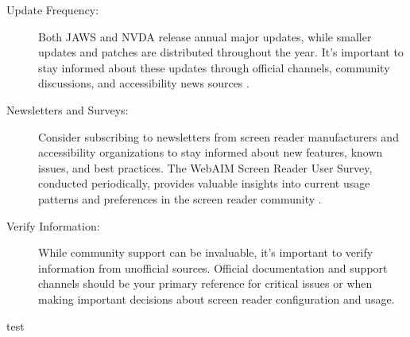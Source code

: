\begin{description}
	\item[Update Frequency:] Both JAWS and NVDA release annual major updates, while smaller updates and patches are distributed throughout the year. It's important to stay informed about these updates through official channels, community discussions, and accessibility news sources \cite{JAWSWhatsNew, turn0search9}.
	\item[Newsletters and Surveys:] Consider subscribing to newsletters from screen reader manufacturers and accessibility organizations to stay informed about new features, known issues, and best practices. The WebAIM Screen Reader User Survey, conducted periodically, provides valuable insights into current usage patterns and preferences in the screen reader community \cite{WebAIMSurvey}.
	\item[Verify Information:] While community support can be invaluable, it's important to verify information from unofficial sources. Official documentation and support channels should be your primary reference for critical issues or when making important decisions about screen reader configuration and usage.
\end{description}
test
